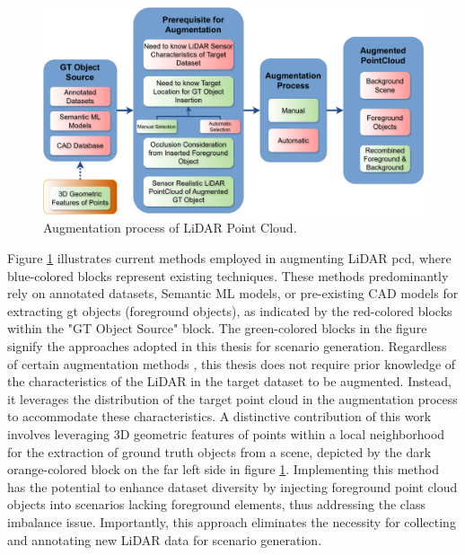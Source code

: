 \begin{figure}[htbp]
    \centering
    \includegraphics[width=1\linewidth]{97_graphics//related_work/related_work_block_diagram.pdf}
    \caption{Augmentation process of LiDAR Point Cloud.}
    \label{fig:sota-related_work_block_diagram}
\end{figure}


Figure \ref{fig:sota-related_work_block_diagram} illustrates current methods employed in augmenting LiDAR \acrfull{pcd}, where blue-colored blocks represent existing techniques. These methods predominantly rely on annotated datasets, Semantic ML models, or pre-existing CAD models for extracting \acrfull{gt} objects (foreground objects), as indicated by the red-colored blocks within the "GT Object Source" block. The green-colored blocks in the figure signify the approaches adopted in this thesis for scenario generation. Regardless of certain augmentation methods \parencite{9811816, dada_2023}, this thesis does not require prior knowledge of the characteristics of the LiDAR in the target dataset to be augmented. Instead, it leverages the distribution of the target point cloud in the augmentation process to accommodate these characteristics. A distinctive contribution of this work involves leveraging 3D geometric features of points within a local neighborhood for the extraction of ground truth objects from a scene, depicted by the dark orange-colored block on the far left side in figure \ref{fig:sota-related_work_block_diagram}. Implementing this method has the potential to enhance dataset diversity by injecting foreground point cloud objects into scenarios lacking foreground elements, thus addressing the class imbalance issue. Importantly, this approach eliminates the necessity for collecting and annotating new LiDAR data for scenario generation.

